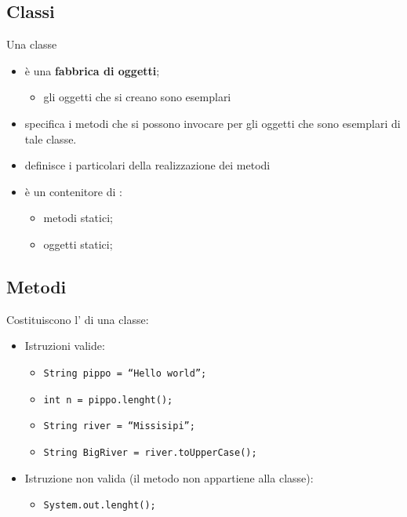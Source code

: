 \subsection*{Classi}
\begin{frame}
\begin{block}{Una classe}
\begin{itemize}
\item è una \textbf{fabbrica di oggetti};
\begin{itemize}
\item gli oggetti che si creano sono \alert{esemplari}
\end{itemize}
\item specifica i metodi che si possono invocare per gli oggetti che sono esemplari di tale classe.
\item definisce i particolari della realizzazione dei metodi
\item è un contenitore di :
\begin{itemize}
\item metodi statici;
\item oggetti statici;
\end{itemize}
\end{itemize}
\end{block}
\end{frame}

\subsection*{Metodi}
\begin{frame}
\begin{block}{}
Costituiscono l' di una classe:
\begin{itemize}
\item Istruzioni valide:
\begin{itemize}
\item \texttt{String pippo = ``Hello world'';}
\item \texttt{int n = pippo.\alert{lenght()};}
\item \texttt{String river = ``Missisipi'';}
\item \texttt{String BigRiver = river.\alert{toUpperCase();}}
\end{itemize}
\item Istruzione non valida (il metodo non appartiene alla classe):
\begin{itemize}
\item \texttt{System.out\alert{.lenght();}}
\end{itemize}
\end{itemize}
\end{block}
\end{frame}

